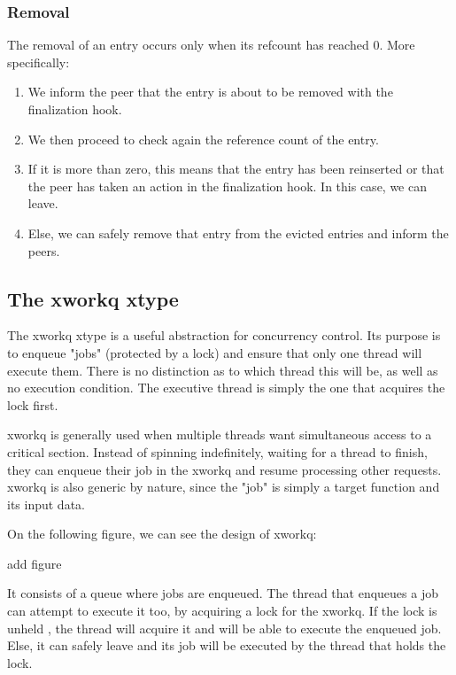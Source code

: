 \subsubsection{Removal}

The removal of an entry occurs only when its refcount has reached 0. More 
specifically:

\begin{enumerate}
	\item We inform the peer that the entry is about to be removed with the
		finalization hook.
	\item We then proceed to check again the reference count of the entry.
	\item If it is more than zero, this means that the entry has been 
		reinserted or that the peer has taken an action in the 
		finalization hook. In this case, we can leave.
	\item Else, we can safely remove that entry from the evicted entries 
		and inform the peers.
\end{enumerate}

\subsection{The xworkq xtype}\label{sec:xworkq-design}

The xworkq xtype is a useful abstraction for concurrency control. Its purpose 
is to enqueue "jobs" (protected by a lock) and ensure that only one thread will 
execute them. There is no distinction as to which thread this will be, as well 
as no execution condition. The executive thread is simply the one that acquires 
the lock first.

xworkq is generally used when multiple threads want simultaneous access to a 
critical section. Instead of spinning indefinitely, waiting for a thread to 
finish, they can enqueue their job in the xworkq and resume processing other 
requests. xworkq is also generic by nature, since the "job" is simply a target 
function and its input data.

On the following figure, we can see the design of xworkq:

\fixme add figure

It consists of a queue where jobs are enqueued.  The thread that enqueues a job 
can attempt to execute it too, by acquiring a lock for the xworkq. If the lock 
is unheld%
, the thread will acquire it and will be able to execute the enqueued job.  
Else, it can safely leave and its job will be executed by the thread that holds 
the lock.

